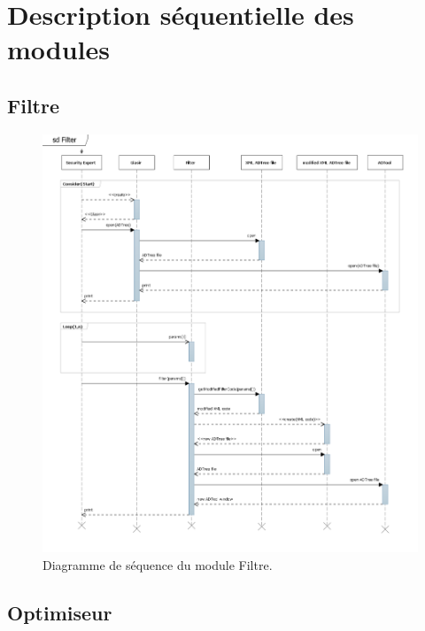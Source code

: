 \section{Description séquentielle des modules}
    \label{sec:modules}
    
	\subsection{Filtre}

	    \begin{figure}[H]
	        \centering
	        \includegraphics[height=1\textwidth]{figure/Filter.png}
	        \caption{Diagramme de séquence du module Filtre.}
	        \label{fig:filter}
	    \end{figure}

	\subsection{Optimiseur}

